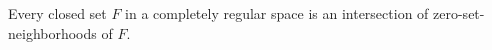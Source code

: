 Every closed set $F$ in a completely regular space is an intersection of zero-set-neighborhoods of $F$.

